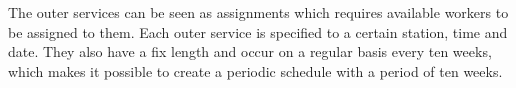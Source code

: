 The outer services can be seen as assignments which requires available workers to be assigned to them. Each outer service is specified to a certain station, time and date. They also have a fix length and occur on a regular basis every ten weeks, which makes it possible to create a periodic schedule with a period of ten weeks. 






